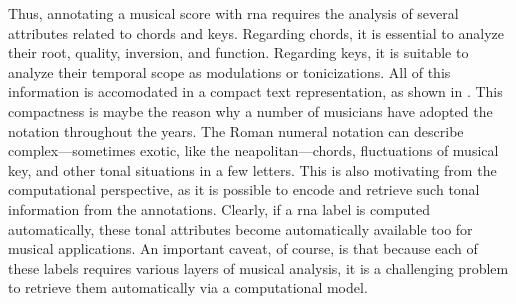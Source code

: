 Thus, annotating a musical score with \gls{rna} requires the
analysis of several attributes related to chords and keys.
Regarding chords, it is essential to analyze their root,
quality, inversion, and function. Regarding keys, it is
suitable to analyze their temporal scope as modulations or
tonicizations. All of this information is accomodated in a
compact text representation, as shown in
. This compactness is maybe
the reason why a number of musicians have adopted the
notation throughout the years. The Roman numeral notation
can describe complex---sometimes exotic, like the
\gls{neapolitan}---chords, fluctuations of musical key, and
other tonal situations in a few letters. This is also
motivating from the computational perspective, as it is
possible to encode and retrieve such tonal information from
the annotations. Clearly, if a \gls{rna} label is computed
automatically, these tonal attributes become automatically
available too for musical applications. An important caveat,
of course, is that because each of these labels requires
various layers of musical analysis, it is a challenging
problem to retrieve them automatically via a computational
model.







